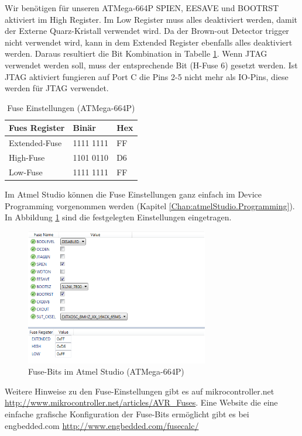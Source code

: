 Wir benötigen für unseren ATMega-664P SPIEN, EESAVE und BOOTRST aktiviert im
High Register. Im Low Register muss alles deaktiviert werden, damit der Externe
Quarz-Kristall verwendet wird. Da der Brown-out Detector trigger nicht
verwendet wird, kann in dem Extended Register ebenfalls alles deaktiviert
werden. Daraus resultiert die Bit Kombination in Tabelle \ref{fuses-result}.
Wenn \ac{JTAG} verwendet werden soll, muss der entsprechende Bit (H-Fuse 6)
gesetzt werden. Ist \ac{JTAG} aktiviert fungieren auf Port C die Pins 2-5
nicht mehr als IO-Pins, diese werden für \ac{JTAG} verwendet.

\begin{table}[H]
\centering
\begin{tabular}{|l|l|l|} \hline
Fues Register & Binär & Hex\\ \hline
Extended-Fuse & 1111 1111 & FF\\ \hline
High-Fuse & 1101 0110 & D6\\ \hline
Low-Fuse & 1111 1111 & FF\\ \hline
\end{tabular}
\caption{Fuse Einstellungen (ATMega-664P)}
\label{fuses-result}
\end{table}

Im Atmel Studio können die Fuse Einstellungen ganz einfach im Device Programming
vorgenommen werden (Kapitel \ref{Chap:atmelStudio.Programming}). In Abbildung
\ref{fuses-graf} sind die festgelegten Einstellungen eingetragen.

\begin{figure}[H]
\centering
\includegraphics[width=8cm]{content/pictures/Fusebits/fusebits_atmelstudio.png}
\caption{Fuse-Bits im Atmel Studio (ATMega-664P)}
\label{fuses-graf}
\end{figure}

Weitere Hinweise zu den Fuse-Einstellungen gibt es auf mikrocontroller.net
\url{http://www.mikrocontroller.net/articles/AVR_Fuses}.
Eine Website die eine einfache grafische Konfiguration der Fuse-Bits ermöglicht
gibt es bei engbedded.com \url{http://www.engbedded.com/fusecalc/}

